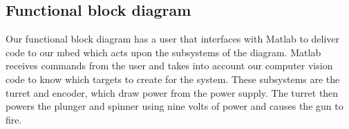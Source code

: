 \documentclass{article}
\begin{document}

%
%
%   
%   
%  
%   
%   
%
%   
%   
%   
%  
%

\subsection{Functional block diagram}
Our functional block diagram has a user that interfaces with Matlab to deliver code to our mbed which acts upon the subsystems of the diagram. Matlab receives commands from the user and takes into account our computer vision code to know which targets to create for the system. These subsystems are the turret and encoder, which draw power from the power supply. The turret then powers the plunger and spinner using nine volts of power and causes the gun to fire.
\end{document}
